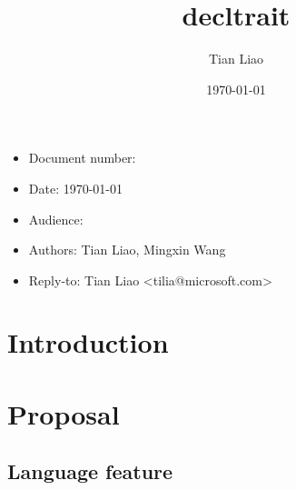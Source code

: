 \documentclass{article}
\title{decltrait}
\author{Tian Liao}
\date{\today}
\begin{document}
\maketitle
\vfill
\begin{itemize}[noitemsep]
  \item[] Document number:
  \item[] Date: \today
  \item[] Audience:
  \item[] Authors: Tian Liao, Mingxin Wang
  \item[] Reply-to: Tian Liao \textless tilia@microsoft.com\textgreater
\end{itemize}

\newpage
{}

\section{Introduction}

\section{Proposal}

\subsection{Language feature}
\end{document}
